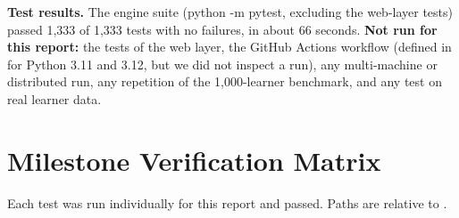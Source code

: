 \documentclass[11pt,a4paper]{article}
\newcommand{\cmd}[1]{{\sffamily\small #1}}
\renewcommand{\_}{\textunderscore\allowbreak{}}
\begin{document}
\textbf{Test results.} The engine suite (\cmd{python -m pytest}, excluding the web-layer tests) passed 1,333 of 1,333 tests with no failures, in about 66 seconds. \textbf{Not run for this report:} the tests of the web layer, the GitHub Actions workflow (defined in  for Python 3.11 and 3.12, but we did not inspect a run), any multi-machine or distributed run, any repetition of the 1,000-learner benchmark, and any test on real learner data.

\section{Milestone Verification Matrix}
\label{sec:matrix}

Each test was run individually for this report and passed. Paths are relative to .
\end{document}
